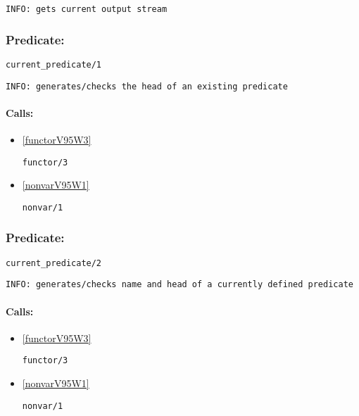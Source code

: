 {\small \begin{verbatim}
INFO: gets current output stream

\end{verbatim}}

\subsubsection{Predicate:} \label{currentV95WpredicateV95W1}

\begin{verbatim}
current_predicate/1
\end{verbatim}

{\small \begin{verbatim}
INFO: generates/checks the head of an existing predicate

\end{verbatim}}
\paragraph{Calls:} 
\begin{itemize}
\item \ref{functorV95W3} 
\begin{verbatim}
functor/3
\end{verbatim}

\item \ref{nonvarV95W1} 
\begin{verbatim}
nonvar/1
\end{verbatim}

\end{itemize}

\subsubsection{Predicate:} \label{currentV95WpredicateV95W2}

\begin{verbatim}
current_predicate/2
\end{verbatim}

{\small \begin{verbatim}
INFO: generates/checks name and head of a currently defined predicate

\end{verbatim}}
\paragraph{Calls:} 
\begin{itemize}
\item \ref{functorV95W3} 
\begin{verbatim}
functor/3
\end{verbatim}

\item \ref{nonvarV95W1} 
\begin{verbatim}
nonvar/1
\end{verbatim}

\end{itemize}
